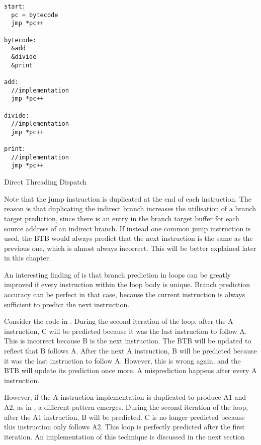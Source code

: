 		\begin{myfigure}
				\begin{lstlisting}
start:
  pc = bytecode
  jmp *pc++

bytecode:
  &add
  &divide
  &print

add:
  //implementation
  jmp *pc++

divide:
  //implementation
  jmp *pc++

print:
  //implementation
  jmp *pc++

				\end{lstlisting}
				\caption{Direct Threading Dispatch}
				\label{fig:directthreading}
		\end{myfigure}
		
		Note that the jump instruction is duplicated at the end of each instruction. The reason is that duplicating the indirect branch increases the utilisation of a branch target prediction, since there is an entry in the branch target buffer for each source address of an indirect branch. If instead one common jump instruction is used, the BTB would always predict that the next instruction is the same as the previous one, which is almost always incorrect. This will be better explained later in this chapter.
		
		An interesting finding of \cite{optimizingindirectbranch} is that branch prediction in loops can be greatly improved if every instruction within the loop body is unique. Branch prediction accuracy can be perfect in that case, because the current instruction is always sufficient to predict the next instruction. 
		
		Consider the code in . During the second iteration of the loop, after the A instruction, C will be predicted because it was the last instruction to follow A. This is incorrect because B is the next instruction. The BTB will be updated to reflect that B follows A. After the next A instruction, B will be predicted because it was the last instruction to follow A. However, this is wrong again, and the BTB will update its prediction once more. A misprediction happens after every A instruction.
		
		However, if the A instruction implementation is duplicated to produce A1 and A2, as in , a different pattern emerges. During the second iteration of the loop, after the A1 instruction, B will be predicted. C is no longer predicted because this instruction only follows A2. This loop is perfectly predicted after the first iteration. An implementation of this technique is discussed in the next section
		
